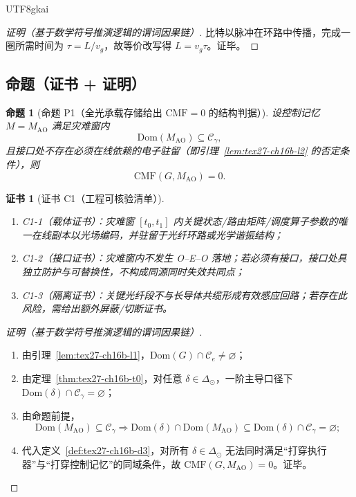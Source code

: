 \documentclass[12pt]{article}
\newtheorem{proposition}{命题}[section]
\newtheorem{Certificate}{证书}[section]
\begin{document}
\begin{CJK*}{UTF8}{gkai}
\begin{proof}[证明（基于数学符号推演逻辑的谓词因果链）]
比特以脉冲在环路中传播，完成一圈所需时间为 $\tau=L/v_g$，故等价改写得 $L=v_g\tau$。证毕。
\end{proof}

\subsection{命题（证书 + 证明）}
\label{subsec:tex27-ch16b-prop}

\begin{proposition}[命题 P1（全光承载存储给出 \texorpdfstring{$\mathrm{CMF}=0$}{CMF=0} 的结构判据）]
\label{prop:tex27-ch16b-p1}
设控制记忆 $M=M_{\mathrm{AO}}$ 满足灾难窗内
\[
  \mathrm{Dom}(M_{\mathrm{AO}})\subseteq\mathcal{C}_{\gamma},
\]
且接口处不存在必须在线依赖的电子驻留（即引理~\ref{lem:tex27-ch16b-l2} 的否定条件），则
\[
  \mathrm{CMF}(G,M_{\mathrm{AO}})=0.
\]
\end{proposition}

\begin{Certificate}[证书 C1（工程可核验清单）]
\label{cert:tex27-ch16b-c1}
\begin{enumerate}
  \item C1-1（载体证书）：灾难窗 $[t_0,t_1]$ 内关键状态/路由矩阵/调度算子参数的唯一在线副本以光场编码，并驻留于光纤环路或光学谐振结构；
  \item C1-2（接口证书）：灾难窗内不发生 O--E--O 落地；若必须有接口，接口处具独立防护与可替换性，不构成同源同时失效共同点；
  \item C1-3（隔离证书）：关键光纤段不与长导体共缆形成有效感应回路；若存在此风险，需给出额外屏蔽/切断证书。
\end{enumerate}
\end{Certificate}

\begin{proof}[证明（基于数学符号推演逻辑的谓词因果链）]
\begin{enumerate}
  \item 由引理~\ref{lem:tex27-ch16b-l1}，$\mathrm{Dom}(G)\cap\mathcal{C}_{e}\neq\varnothing$；
  \item 由定理~\ref{thm:tex27-ch16b-t0}，对任意 $\delta\in\Delta_{\odot}$，一阶主导口径下
  $\mathrm{Dom}(\delta)\cap\mathcal{C}_{\gamma}=\varnothing$；
  \item 由命题前提，
  \[
    \mathrm{Dom}(M_{\mathrm{AO}})\subseteq\mathcal{C}_{\gamma}
    \Rightarrow
    \mathrm{Dom}(\delta)\cap\mathrm{Dom}(M_{\mathrm{AO}})
    \subseteq
    \mathrm{Dom}(\delta)\cap\mathcal{C}_{\gamma}
    =\varnothing;
  \]
  \item 代入定义~\ref{def:tex27-ch16b-d3}，对所有 $\delta\in\Delta_{\odot}$ 无法同时满足“打穿执行器”与“打穿控制记忆”的同域条件，故 $\mathrm{CMF}(G,
    M_{\mathrm{AO}})=0$。证毕。
\end{enumerate}
\end{proof}


\end{CJK*}
\end{document}
